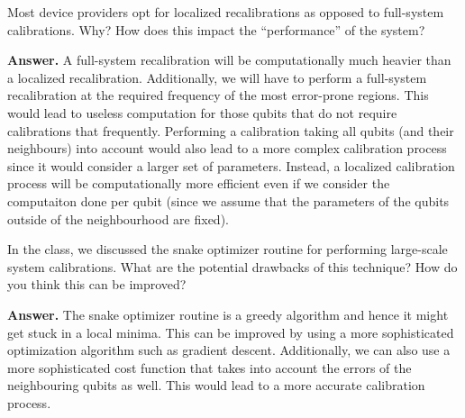 \begin{question}
    Most device providers opt for localized recalibrations as opposed to full-system calibrations. Why? How does this impact the “performance” of the system?
\end{question}
\textbf{Answer.} A full-system recalibration will be computationally much heavier than a localized recalibration. Additionally, we will have to perform a full-system recalibration at the required frequency of the most error-prone regions. This would lead to useless computation for those qubits that do not require calibrations that frequently. Performing a calibration taking all qubits (and their neighbours) into account would also lead to a more complex calibration process since it would consider a larger set of parameters. Instead, a localized calibration process will be computationally more efficient even if we consider the computaiton done per qubit (since we assume that the parameters of the qubits outside of the neighbourhood are fixed).

\tcbline{}

\begin{question}
    In the class, we discussed the snake optimizer routine for performing large-scale system calibrations. What are the potential drawbacks of this technique? How do you think this can be improved?
\end{question}
\textbf{Answer.} The snake optimizer routine is a greedy algorithm and hence it might get stuck in a local minima. This can be improved by using a more sophisticated optimization algorithm such as gradient descent. Additionally, we can also use a more sophisticated cost function that takes into account the errors of the neighbouring qubits as well. This would lead to a more accurate calibration process. %